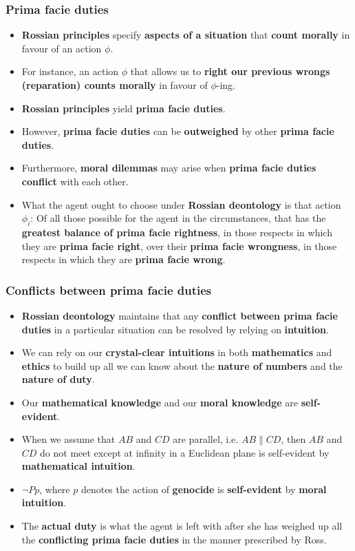 \documentclass[11pt]{article}
\begin{document}
\subsubsection{Prima facie duties}
\label{sec:org0a4235e}
\begin{itemize}
\item \textbf{Rossian principles} specify \textbf{aspects of a situation} that \textbf{count morally} in favour of an action \(\phi\).
\item For instance, an action \(\phi\) that allows us to \textbf{right our previous wrongs (reparation) counts morally} in favour of \(\phi\)-ing.
\item \textbf{Rossian principles} yield \textbf{prima facie duties}.
\item However, \textbf{prima facie duties} can be \textbf{outweighed} by other \textbf{prima facie duties}.
\item Furthermore, \textbf{moral dilemmas} may arise when \textbf{prima facie duties conflict} with each other.
\item What the agent ought to choose under \textbf{Rossian deontology} is that action \(\phi_i\):
Of all those possible for the agent in the circumstances, that has the \textbf{greatest balance of prima facie rightness}, in those respects in which they are \textbf{prima facie right}, over their \textbf{prima facie wrongness}, in those respects in which they are \textbf{prima facie wrong}.
\end{itemize}
\subsubsection{Conflicts between prima facie duties}
\label{sec:org7499b20}
\begin{itemize}
\item \textbf{Rossian deontology} maintains that any \textbf{conflict between prima facie duties} in a particular situation can be resolved by relying on \textbf{intuition}.
\item We can rely on our \textbf{crystal-clear intuitions} in both \textbf{mathematics} and \textbf{ethics} to build up all we can know about the \textbf{nature of numbers} and the \textbf{nature of duty}.
\item Our \textbf{mathematical knowledge} and our \textbf{moral knowledge} are \textbf{self-evident}.
\item When we assume that \(AB\) and \(CD\) are parallel, i.e. \(AB \parallel CD\), then \(AB\) and \(CD\) do not meet except at infinity in a Euclidean plane is self-evident by \textbf{mathematical intuition}.
\item \(\neg Pp\), where \(p\) denotes the action of \textbf{genocide} is \textbf{self-evident} by \textbf{moral intuition}.
\item The \textbf{actual duty} is what the agent is left with after she has weighed up all the \textbf{conflicting prima facie duties} in the manner prescribed by Ross.
\end{itemize}
\end{document}
